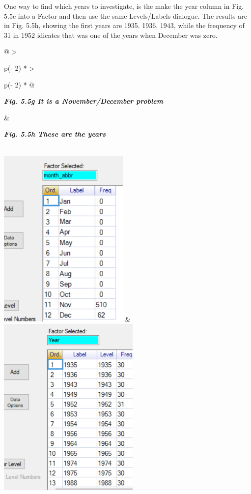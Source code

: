 \documentclass[
  letterpaper,
  DIV=11,
  numbers=noendperiod]{scrreprt}
\begin{document}
One way to find which years to investigate, is the make the year column
in Fig. 5.5e into a Factor and then use the same Levels/Labels dialogue.
The results are in Fig. 5.5h, showing the first years are 1935. 1936,
1943, while the frequency of 31 in 1952 idicates that was one of the
years when December was zero.

\begin{longtable}[]{@{}
  >{\raggedright\arraybackslash}p{(\columnwidth - 2\tabcolsep) * }
  >{\raggedright\arraybackslash}p{(\columnwidth - 2\tabcolsep) * }@{}}
\toprule\noalign{}
\begin{minipage}[b]{\linewidth}\raggedright
\textbf{\emph{Fig. 5.5g It is a November/December problem}}
\end{minipage} & \begin{minipage}[b]{\linewidth}\raggedright
\textbf{\emph{Fig. 5.5h These are the years}}
\end{minipage} \\
\midrule\noalign{}
\endhead
\bottomrule\noalign{}
\endlastfoot
\includegraphics[width=2.52206in,height=3.51626in]{figures/Fig5.5g.png}
&
\includegraphics[width=2.72931in,height=3.52101in]{figures/Fig5.5h.png} \\
\end{longtable}
\end{document}

